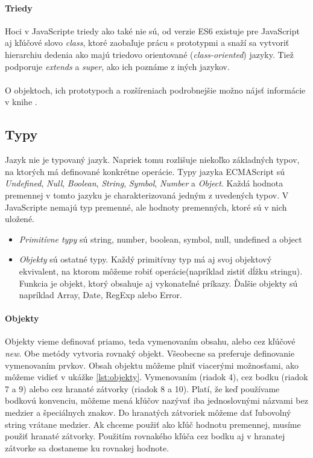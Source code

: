 \paragraph{Triedy}
Hoci v JavaScripte triedy ako také nie sú, od verzie ES6 existuje pre JavaScript aj kľúčové slovo \emph{class}, ktoré zaobaľuje prácu s prototypmi a snaží sa vytvoriť hierarchiu dedenia ako majú triedovo orientované (\emph{class-oriented}) jazyky. Tiež podporuje \emph{extends} a \emph{super}, ako ich poznáme z iných jazykov.

\paragraph{}
O objektoch, ich prototypoch a rozšíreniach podrobnejšie možno nájsť informácie v knihe \cite[this \& Object Prototypes]{youDontKnowJS3}.

\subsection{Typy}
Jazyk \JS{} nie je typovaný jazyk. Napriek tomu rozlišuje niekoľko základných typov, na ktorých má definované konkrétne operácie. Typy jazyka ECMAScript sú \emph{Undefined}, \emph{Null}, \emph{Boolean}, \emph{String}, \emph{Symbol}, \emph{Number} a \emph{Object}. Každá hodnota premennej v tomto jazyku je charakterizovaná jedným z uvedených typov. V JavaScripte nemajú typ premenné, ale hodnoty premenných, ktoré sú v nich uložené. 

\begin{itemize}
  \item \emph{Primitívne typy} sú string, number, boolean, symbol, null, undefined a object
  \item \emph{Objekty} sú ostatné typy. Každý primitívny typ má aj svoj objektový ekvivalent, na ktorom môžeme robiť operácie(napríklad zistiť dĺžku stringu). Funkcia je objekt, ktorý obsahuje aj vykonateľné príkazy. Ďalšie objekty sú napríklad Array, Date, RegExp alebo Error.
\end{itemize}

\paragraph{Objekty}
Objekty vieme definovať priamo, teda vymenovaním obsahu, alebo cez kľúčové \emph{new}. Obe metódy vytvoria rovnaký objekt. Všeobecne sa preferuje definovanie vymenovaním prvkov.
Obsah objektu môžeme plniť viacerými možnosťami, ako môžeme vidieť v ukážke \ref{lst:objekty}. Vymenovaním (riadok 4), cez bodku (riadok 7 a 9) alebo cez hranaté zátvorky (riadok 8 a 10). Platí, že keď používame bodkovú konvenciu, môžeme mená kľúčov nazývať iba jednoslovnými názvami bez medzier a špeciálnych znakov. Do hranatých zátvoriek môžeme dať ľubovolný string vrátane medzier. Ak chceme použiť ako kľúč hodnotu premennej, musíme použiť hranaté zátvorky. Použitím rovnakého kľúča cez bodku aj v hranatej zátvorke sa dostaneme ku rovnakej hodnote.

